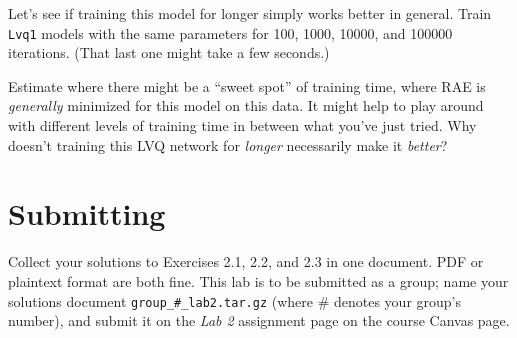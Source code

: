 \documentclass[11pt]{cselabheader}
\begin{document}
\begin{itemize}[leftmargin=*]
  \begin{ex}
    Let's see if training this model for longer simply works better in general. Train \texttt{Lvq1} models with the same parameters for 100, 1000, 10000, and 100000 iterations. (That last one might take a few seconds.)

    Estimate where there might be a ``sweet spot'' of training time, where RAE is \textit{generally} minimized for this model on this data. It might help to play around with different levels of training time in between what you've just tried. Why doesn't training this LVQ network for \textit{longer} necessarily make it \textit{better}?
  \end{ex}
\end{itemize}

\pagebreak

\section{Submitting}

Collect your solutions to Exercises 2.1, 2.2, and 2.3 in one document. PDF or plaintext format are both fine. This lab is to be submitted as a group; name your solutions document \texttt{group\_\#\_lab2.tar.gz} (where \# denotes your group's number), and submit it on the \textit{Lab 2} assignment page on the course Canvas page.
\end{document}
